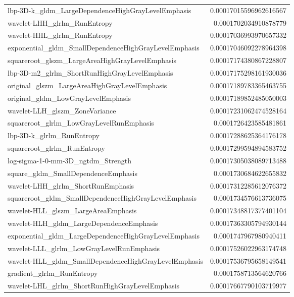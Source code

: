 {\begin{xltabular}[H]{\textwidth}{X r}
        lbp-3D-k\_gldm\_LargeDependenceHighGrayLevelEmphasis & 0.00017015596962616567 \\
        wavelet-LHH\_glrlm\_RunEntropy & 0.0001702034910878779 \\
        wavelet-HHL\_glrlm\_RunEntropy & 0.00017036993970657332 \\
        exponential\_gldm\_SmallDependenceHighGrayLevelEmphasis & 0.00017046092278964398 \\
        squareroot\_glszm\_LargeAreaHighGrayLevelEmphasis & 0.00017174380867228807 \\
        lbp-3D-m2\_glrlm\_ShortRunHighGrayLevelEmphasis & 0.00017175298161930036 \\
        original\_glszm\_LargeAreaHighGrayLevelEmphasis & 0.00017189783365463755 \\
        original\_gldm\_LowGrayLevelEmphasis & 0.00017189852485050003 \\
        wavelet-LLH\_glszm\_ZoneVariance & 0.00017231062474528164 \\
        squareroot\_glrlm\_LowGrayLevelRunEmphasis & 0.0001726423585481861 \\
        lbp-3D-k\_glrlm\_RunEntropy & 0.00017288625364176178 \\
        squareroot\_glrlm\_RunEntropy & 0.00017299594894583752 \\
        log-sigma-1-0-mm-3D\_ngtdm\_Strength & 0.00017305038089713488 \\
        square\_gldm\_SmallDependenceEmphasis & 0.0001730684622655832 \\
        wavelet-LHH\_glrlm\_ShortRunEmphasis & 0.00017312285612076372 \\
        squareroot\_gldm\_SmallDependenceHighGrayLevelEmphasis & 0.0001734576613736075 \\
        wavelet-HLL\_glszm\_LargeAreaEmphasis & 0.00017348817377401104 \\
        wavelet-HLH\_gldm\_LargeDependenceEmphasis & 0.00017363305794930144 \\
        exponential\_gldm\_LargeDependenceHighGrayLevelEmphasis & 0.0001747967980940411 \\
        wavelet-LLL\_glrlm\_LowGrayLevelRunEmphasis & 0.00017526022963174748 \\
        wavelet-HLL\_gldm\_SmallDependenceHighGrayLevelEmphasis & 0.00017536795658149541 \\
        gradient\_glrlm\_RunEntropy & 0.0001758713564620766 \\
        wavelet-LHL\_glrlm\_ShortRunHighGrayLevelEmphasis & 0.00017667790103719977 \\

\end{xltabular}}
